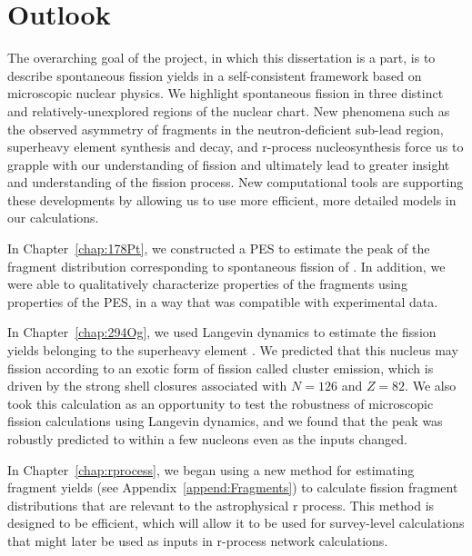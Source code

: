 \chapter{Outlook}\label{chap:Outlook}

The overarching goal of the project, in which this dissertation is a part, is to describe spontaneous fission yields in a self-consistent framework based on microscopic nuclear physics. We highlight spontaneous fission in three distinct and relatively-unexplored regions of the nuclear chart. New phenomena such as the observed asymmetry of fragments in the neutron-deficient sub-lead region, superheavy element synthesis and decay, and r-process nucleosynthesis force us to grapple with our understanding of fission and ultimately lead to greater insight and understanding of the fission process. New computational tools are supporting these developments by allowing us to use more efficient, more detailed models in our calculations.

In Chapter~\ref{chap:178Pt}, we constructed a PES to estimate the peak of the fragment distribution corresponding to spontaneous fission of {\Pt}. In addition, we were able to qualitatively characterize properties of the fragments using properties of the PES, in a way that was compatible with experimental data.

In Chapter~\ref{chap:294Og}, we used Langevin dynamics to estimate the fission yields belonging to the superheavy element {\Og}. We predicted that this nucleus may fission according to an exotic form of fission called cluster emission, which is driven by the strong shell closures associated with $N=126$ and $Z=82$. We also took this calculation as an opportunity to test the robustness of microscopic fission calculations using Langevin dynamics, and we found that the peak was robustly predicted to within a few nucleons even as the inputs changed.

In Chapter~\ref{chap:rprocess}, we began using a new method for estimating fragment yields (see Appendix~\ref{append:Fragments}) to calculate fission fragment distributions that are relevant to the astrophysical r process. This method is designed to be efficient, which will allow it to be used for survey-level calculations that might later be used as inputs in r-process network calculations.

